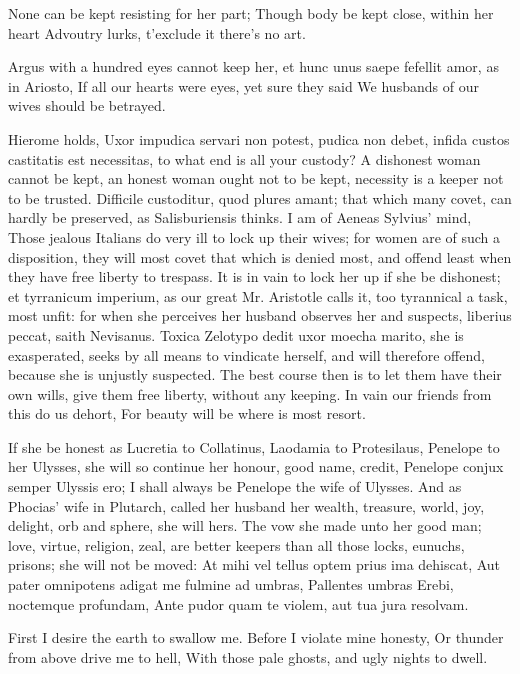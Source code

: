 {None can be kept resisting for her part;
Though body be kept close, within her heart
Advoutry lurks, t'exclude it there's no art.

Argus with a hundred eyes cannot keep her, et hunc unus saepe fefellit
amor, as in Ariosto,
If all our hearts were eyes, yet sure they said
We husbands of our wives should be betrayed.

Hierome holds, Uxor impudica servari non potest, pudica non debet,
infida custos castitatis est necessitas, to what end is all your
custody? A dishonest woman cannot be kept, an honest woman ought not to
be kept, necessity is a keeper not to be trusted. Difficile custoditur,
quod plures amant; that which many covet, can hardly be preserved, as
 Salisburiensis thinks. I am of Aeneas Sylvius' mind, Those
jealous Italians do very ill to lock up their wives; for women are of
such a disposition, they will most covet that which is denied most, and
offend least when they have free liberty to trespass. It is in vain to
lock her up if she be dishonest; et tyrranicum imperium, as our great
Mr. Aristotle calls it, too tyrannical a task, most unfit: for when she
perceives her husband observes her and suspects, liberius peccat, saith
Nevisanus. Toxica Zelotypo dedit uxor moecha marito, she is
exasperated, seeks by all means to vindicate herself, and will
therefore offend, because she is unjustly suspected. The best course
then is to let them have their own wills, give them free liberty,
without any keeping.
In vain our friends from this do us dehort,
For beauty will be where is most resort.

If she be honest as Lucretia to Collatinus, Laodamia to Protesilaus,
Penelope to her Ulysses, she will so continue her honour, good name,
credit, Penelope conjux semper Ulyssis ero; I shall always be Penelope
the wife of Ulysses. And as Phocias' wife in Plutarch, called her
husband her wealth, treasure, world, joy, delight, orb and sphere, she
will hers. The vow she made unto her good man; love, virtue, religion,
zeal, are better keepers than all those locks, eunuchs, prisons; she
will not be moved:
At mihi vel tellus optem prius ima dehiscat,
Aut pater omnipotens adigat me fulmine ad umbras,
Pallentes umbras Erebi, noctemque profundam,
Ante pudor quam te violem, aut tua jura resolvam.

First I desire the earth to swallow me.
Before I violate mine honesty,
Or thunder from above drive me to hell,
With those pale ghosts, and ugly nights to dwell.

}
